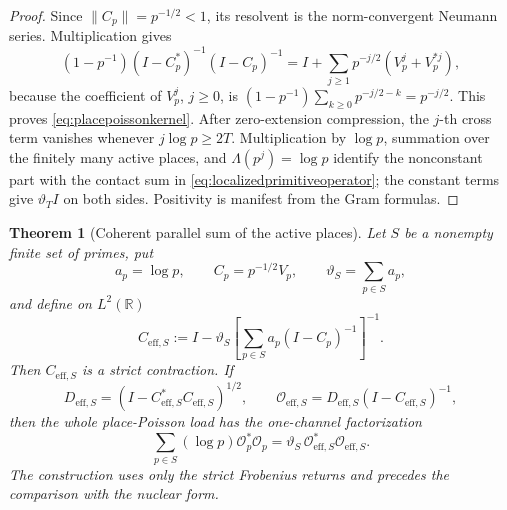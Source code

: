 \documentclass[11pt]{amsart}
\newtheorem{theorem}{Theorem}[section]
\theoremstyle{definition}
\theoremstyle{remark}
\begin{document}
\begin{proof}
Since \(\|C_p\|=p^{-1/2}<1\), its resolvent is the norm-convergent
Neumann series.  Multiplication gives
\[
 (1-p^{-1})(I-C_p^*)^{-1}(I-C_p)^{-1}
 =I+\sum_{j\ge1}p^{-j/2}(V_p^j+V_p^{*j}),
\]
because the coefficient of $V_p^j$, $j\ge0$, is
\((1-p^{-1})\sum_{k\ge0}p^{-j/2-k}=p^{-j/2}\).
This proves \eqref{eq:placepoissonkernel}.  After zero-extension compression,
the $j$-th cross term vanishes whenever $j\log p\ge2T$.  Multiplication
by \(\log p\), summation over the finitely many active places, and
\(\Lambda(p^j)=\log p\) identify the nonconstant part with the contact
sum in \eqref{eq:localizedprimitiveoperator}; the constant terms give
\(\vartheta_TI\) on both sides.  Positivity is manifest from the Gram
formulas.
\end{proof}

\begin{theorem}[Coherent parallel sum of the active places]
\label{thm:coherentparallelsum}
Let $S$ be a nonempty finite set of primes, put
\[
 a_p=\log p,\qquad C_p=p^{-1/2}V_p,\qquad
 \vartheta_S=\sum_{p\in S}a_p,
\]
and define on $L^2(\mathbb R)$
\begin{equation}\label{eq:effectivefrobeniusreturn}
 C_{\mathrm{eff},S}
 :=I-\vartheta_S\left[
       \sum_{p\in S}a_p(I-C_p)^{-1}\right]^{-1}.
\end{equation}
Then $C_{\mathrm{eff},S}$ is a strict contraction.  If
\[
 D_{\mathrm{eff},S}
   =(I-C_{\mathrm{eff},S}^*C_{\mathrm{eff},S})^{1/2},
 \qquad
 \mathcal O_{\mathrm{eff},S}
   =D_{\mathrm{eff},S}(I-C_{\mathrm{eff},S})^{-1},
\]
then the whole place-Poisson load has the one-channel factorization
\begin{equation}\label{eq:coherentparallelsum}
 \boxed{
 \sum_{p\in S}(\log p)\mathcal O_p^*\mathcal O_p
 =\vartheta_S\,
   \mathcal O_{\mathrm{eff},S}^*
   \mathcal O_{\mathrm{eff},S}.}
\end{equation}
The construction uses only the strict Frobenius returns and precedes the
comparison with the nuclear form.
\end{theorem}
\end{document}
